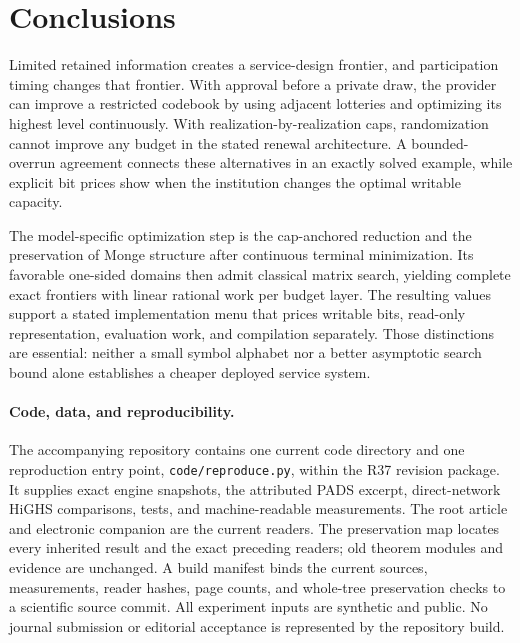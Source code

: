 \section{Conclusions}\label{sec:conclusion}
Limited retained information creates a service-design frontier, and participation timing changes that frontier. With approval before a private draw, the provider can improve a restricted codebook by using adjacent lotteries and optimizing its highest level continuously. With realization-by-realization caps, randomization cannot improve any budget in the stated renewal architecture. A bounded-overrun agreement connects these alternatives in an exactly solved example, while explicit bit prices show when the institution changes the optimal writable capacity.

The model-specific optimization step is the cap-anchored reduction and the preservation of Monge structure after continuous terminal minimization. Its favorable one-sided domains then admit classical matrix search, yielding complete exact frontiers with linear rational work per budget layer. The resulting values support a stated implementation menu that prices writable bits, read-only representation, evaluation work, and compilation separately. Those distinctions are essential: neither a small symbol alphabet nor a better asymptotic search bound alone establishes a cheaper deployed service system.

\paragraph{Code, data, and reproducibility.}
The accompanying repository contains one current code directory and one reproduction entry point, \texttt{code/reproduce.py}, within the R37 revision package. It supplies exact engine snapshots, the attributed PADS excerpt, direct-network HiGHS comparisons, tests, and machine-readable measurements. The root article and electronic companion are the current readers. The preservation map locates every inherited result and the exact preceding readers; old theorem modules and evidence are unchanged. A build manifest binds the current sources, measurements, reader hashes, page counts, and whole-tree preservation checks to a scientific source commit. All experiment inputs are synthetic and public. No journal submission or editorial acceptance is represented by the repository build.

